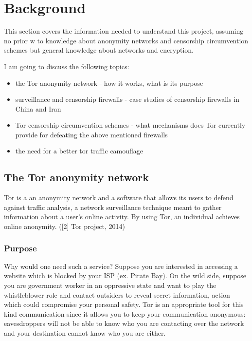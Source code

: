 \documentclass[11pt]{article} %
\begin{document}
\newpage
\section{Background}


This section covers the information needed to understand this project, assuming no prior w to knowledge about anonymity networks and censorship circumvention schemes but general knowledge about networks and encryption.

I am going to discuss the following topics:

\begin{itemize}
\item the Tor anonymity network - how it works, what is its purpose
\item surveillance and censorship firewalls - case studies of censorship firewalls in China and Iran 
\item Tor censorship circumvention schemes - what mechanisms does Tor currently provide for defeating the above mentioned firewalls
\item the need for a better tor traffic camouflage
\end{itemize}

\subsection{The Tor anonymity network}
Tor is a an anonymity network and a software that allows its users to defend against traffic analysis, a network surveillance technique meant to gather information about a user’s online activity. By using Tor, an individual achieves online anonymity. ([2] Tor project, 2014)

\subsubsection{Purpose}
Why would one need such a service? Suppose you are interested in accessing a website which is blocked by your ISP (ex. Pirate Bay). On the wild side, suppose you are government worker in an oppressive state and want to play the whistleblower role and contact outsiders to reveal secret information, action which could compromise your personal safety. Tor is an appropriate tool for this kind communication since it allows you to keep your communication anonymous: eavesdroppers will not be able to know who you are contacting over the network and your destination cannot know who you are either.
\end{document}
